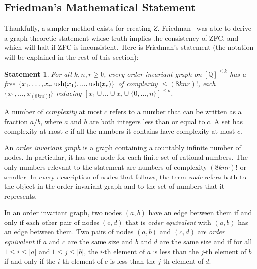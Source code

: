 \documentclass[11pt]{article}
\newtheorem{statement}{Statement}
\begin{document}
\subsection{Friedman's Mathematical Statement}

Thankfully, a simpler method exists for creating $Z$. Friedman~\cite{friedman}
was able to derive a graph-theoretic statement whose truth implies the consistency of ZFC, and which will halt if ZFC is inconsistent.\footnotemark~Here is Friedman's statement (the notation will be explained in the rest of this section): 

\begin{statement} \label{eq:friedman}
For all $k, n, r \ge 0$, every order invariant graph on $[\mathbb{Q}]^{\le k}$ has a free $\{x_1,\dots,x_r, \\
\textrm{ush}(x_1),...,\textrm{ush}(x_r)\}$ of complexity $\le (8knr)!$, each $\{x_1, \dots, x_{(8kni)!}\}$
reducing $[x_1 \cup \dots \cup x_i \cup \{0,\dots,n\}]^{\le k}$. \cite{friedman}
\end{statement}

A number of \emph{complexity} at most $c$ refers to a number that can be written as a fraction $a/b$, where $a$ and $b$ are both integers less than or equal to $c$. A set has complexity at most $c$ if all the numbers it contains have complexity at most $c$.  

An \emph{order invariant graph} is a graph containing a countably infinite number of nodes. In particular, it has one node for each finite set of rational numbers. The only numbers relevant to the statement are numbers of complexity $(8knr)!$ or smaller. In every description of nodes that follows, the term \emph{node} refers both to the object in the order invariant graph and to the set of numbers that it represents. 

In an order invariant graph, two nodes $(a,b)$ have an edge between them if and only if each other pair of nodes $(c,d)$ that is \emph{order equivalent} with $(a,b)$ has an edge between them. Two pairs of nodes $(a, b)$ and $(c, d)$ are \emph{order equivalent} if $a$ and $c$ are the same size and $b$ and $d$ are the same size and if for all $1 \le i \le |a|$ and $1 \le j \le |b|$, the $i$-th element of $a$ is less than the $j$-th element of $b$ if and only if the $i$-th element of $c$ is less than the $j$-th element of $d$. 
\end{document}
